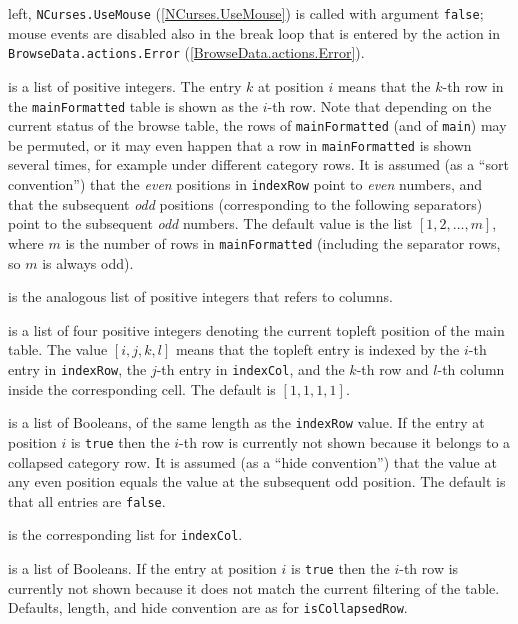 \documentclass[a4paper,11pt]{report}
\begin{document}
{{{\begin{description}
left, \texttt{NCurses.UseMouse} (\ref{NCurses.UseMouse}) is called with argument \texttt{false}; mouse events are disabled also in the break loop that is entered by the
action in \texttt{BrowseData.actions.Error} (\ref{BrowseData.actions.Error}). 
\item[{\texttt{indexRow}}]  is a list of positive integers. The entry $k$ at position $i$ means that the $k$-th row in the \texttt{mainFormatted} table is shown as the $i$-th row. Note that depending on the current status of the browse table, the
rows of \texttt{mainFormatted} (and of \texttt{main}) may be permuted, or it may even happen that a row in \texttt{mainFormatted} is shown several times, for example under different category rows. It is
assumed (as a ``sort convention'')  that the \emph{even} positions in \texttt{indexRow} point to \emph{even} numbers, and that the subsequent \emph{odd} positions (corresponding to the following separators) point to the subsequent \emph{odd} numbers. The default value is the list $[ 1, 2, \ldots, m ]$, where $m$ is the number of rows in \texttt{mainFormatted} (including the separator rows, so $m$ is always odd). 
\item[{\texttt{indexCol}}]  is the analogous list of positive integers that refers to columns. 
\item[{\texttt{topleft}}]  is a list of four positive integers denoting the current topleft position of
the main table. The value $[ i, j, k, l ]$ means that the topleft entry is indexed by the $i$-th entry in \texttt{indexRow}, the $j$-th entry in \texttt{indexCol}, and the $k$-th row and $l$-th column inside the corresponding cell. The default is $[ 1, 1, 1, 1 ]$. 
\item[{\texttt{isCollapsedRow}}]  is a list of Booleans, of the same length as the \texttt{indexRow} value. If the entry at position $i$ is \texttt{true} then the $i$-th row is currently not shown because it belongs to a collapsed category row.
It is assumed (as a ``hide convention'')  that the value at any even position equals the value at the subsequent odd
position. The default is that all entries are \texttt{false}. 
\item[{\texttt{isCollapsedCol}}]  is the corresponding list for \texttt{indexCol}. 
\item[{\texttt{isRejectedRow}}]  is a list of Booleans. If the entry at position $i$ is \texttt{true} then the $i$-th row is currently not shown because it does not match the current filtering
of the table. Defaults, length, and hide convention are as for \texttt{isCollapsedRow}. 

\end{description}}}}
\end{document}
